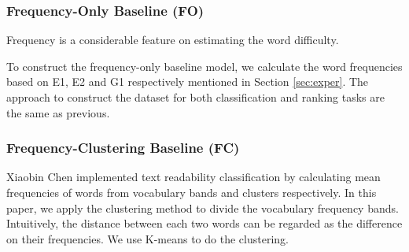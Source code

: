 \subsubsection{Frequency-Only Baseline (FO)}
Frequency is a considerable feature on estimating the word difficulty.

To construct the frequency-only baseline model, 
we calculate the word frequencies 
based on E1, E2 and G1 respectively mentioned in Section \ref{sec:exper}.
The approach to construct the dataset for both classification and ranking tasks are the same as previous. 


\subsubsection{Frequency-Clustering Baseline (FC)}
Xiaobin Chen  implemented text readability classification  by calculating mean frequencies of words from vocabulary bands and clusters respectively.
In this paper, we apply the clustering method to divide the vocabulary frequency bands.
Intuitively, the distance between each two words can be regarded as the difference on their frequencies. We use K-means to do the clustering.

